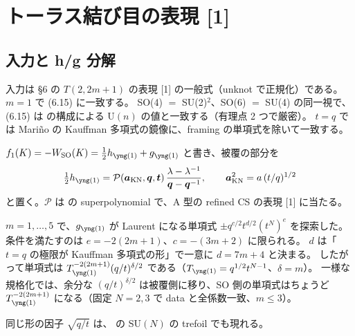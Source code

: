 \section{トーラス結び目の表現 [1]}\label{sec:torus}

\subsection{入力と h/g 分解}
入力は \cite{AgSc12} §6 の $T(2,2m+1)$ の表現 [1] の一般式（unknot で正規化）である。
$m = 1$ で \cite{AgSc12} (6.15) に一致する。
SO(4) $=$ SU(2)$^2$、SO(6) $=$ SU(4) の同一視で、(6.15) は \cite{GN13} の構成による U$(n)$ の値と一致する（有理点 2 つで厳密）。
$t = q$ では Mariño の Kauffman 多項式の鏡像に、framing の単項式を除いて一致する。

\begin{hypothesis}[h/g 分解]\label{hyp:hg}
$f_1(K) = -W_{\SO}(K) = \tfrac12 h_{\yone} + g_{\yone}$ と書き、被覆の部分を
\[
\tfrac12 h_{\yone} = \mathcal{P}(\ba_{\mathrm{KN}}, \bq, \bt)\,\frac{\lambda - \lambda^{-1}}{\bq - \bq^{-1}},\qquad \ba_{\mathrm{KN}}^2 = a\,(t/q)^{1/2}
\]
と置く。$\mathcal P$ は \cite{DGR05} の superpolynomial で、A 型の refined CS の表現 [1] に当たる。
\end{hypothesis}

\begin{compresult}
$m = 1, \dots, 5$ で、$g_{\yone}$ が Laurent になる単項式 $\pm q^{c/2} t^{d/2} (t^N)^e$ を探索した。条件を満たすのは $e = -2(2m+1)$、$c = -(3m+2)$ に限られる。
$d$ は「$t = q$ の極限が Kauffman 多項式の形」で一意に $d = 7m+4$ と決まる。
したがって単項式は $T_{\yone}^{-2(2m+1)}(q/t)^{\delta/2}$ である（$T_{\yone} = q^{1/2}t^{N-1}$、$\delta = m$）。
一様な規格化では、余分な $(q/t)^{\delta/2}$ は被覆側に移り、SO 側の単項式はちょうど $T_{\yone}^{-2(2m+1)}$ になる（固定 $N = 2, 3$ で data と全係数一致、$m \le 3$）。
\end{compresult}
同じ形の因子 $\sqrt{q/t}$ は、\cite{AgSh11} の SU$(N)$ の trefoil でも現れる。

